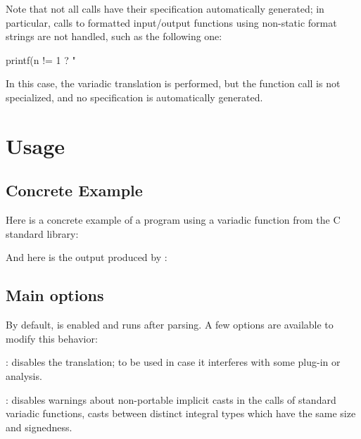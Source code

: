 Note that not all calls have their specification automatically generated;
in particular, calls to formatted input/output functions using non-static
format strings are not handled, such as the following one:

\begin{ccode}
  printf(n != 1 ? "%
\end{ccode}

In this case, the variadic translation is performed, but the function call
is not specialized, and no specification is automatically generated.

\section{Usage}

\subsection{Concrete Example}

Here is a concrete example of a program using a variadic function from the C
standard library:


And here is the output produced by :


\subsection{Main options}

By default,  is enabled and runs after parsing.
A few options are available to modify this behavior:

\begin{description}

\item \texttt{} : disables the translation;
  to be used in case it interferes with some plug-in or analysis.
\item \texttt{} : disables warnings about
  non-portable implicit casts in the calls of standard variadic functions,
  \ie casts between distinct integral types which have the same size and
  signedness.

\end{description}

